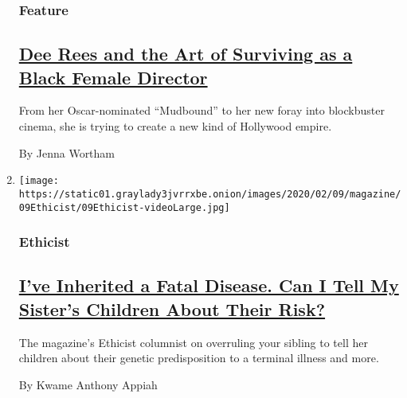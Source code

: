 \begin{enumerate}
  \hypertarget{feature-2}{%
  \subsubsection{Feature}\label{feature-2}}

  \hypertarget{dee-rees-and-the-art-of-surviving-as-a-black-female-director}{%
  \subsection{\texorpdfstring{\href{/2020/02/06/magazine/dee-rees-black-female-director.html}{Dee
  Rees and the Art of Surviving as a Black Female
  Director}}{Dee Rees and the Art of Surviving as a Black Female Director}}\label{dee-rees-and-the-art-of-surviving-as-a-black-female-director}}

  From her Oscar-nominated ``Mudbound'' to her new foray into
  blockbuster cinema, she is trying to create a new kind of Hollywood
  empire.

  By Jenna Wortham
\item
  \texttt{[image: https://static01.graylady3jvrrxbe.onion/images/2020/02/09/magazine/09Ethicist/09Ethicist-videoLarge.jpg]}

  \hypertarget{ethicist}{%
  \subsubsection{Ethicist}\label{ethicist}}

  \hypertarget{ive-inherited-a-fatal-disease-can-i-tell-my-sisters-children-about-their-risk}{%
  \subsection{\texorpdfstring{\href{/2020/02/04/magazine/ive-inherited-a-fatal-disease-can-i-tell-my-sisters-children-about-their-risk.html}{I've
  Inherited a Fatal Disease. Can I Tell My Sister's Children About Their
  Risk?}}{I've Inherited a Fatal Disease. Can I Tell My Sister's Children About Their Risk?}}\label{ive-inherited-a-fatal-disease-can-i-tell-my-sisters-children-about-their-risk}}

  The magazine's Ethicist columnist on overruling your sibling to tell
  her children about their genetic predisposition to a terminal illness
  and more.

  By Kwame Anthony Appiah
\end{enumerate}


